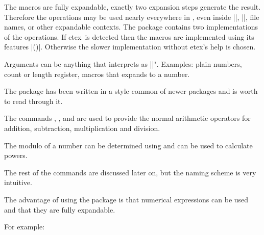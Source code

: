 The macros are fully expandable, exactly two expansion steps generate the
result. Therefore the operations may be used nearly everywhere in \tex, even
inside |\number|, |\csname|, file names, or other expandable contexts.
The package contains two implementations of the operations. If etex\ is detected
then the macros are implemented using its features |(\numexpr)|. Otherwise
the slower implementation without etex's help is chosen.

Arguments can be anything that \tex interprets as |\number|". Examples:
plain numbers, count or length register, macros that expands to a number.

The package has been written in a style common of newer packages and is worth to read through it.




The commands , ,
 and  are used to provide the normal arithmetic operators for addition, subtraction, multiplication and division.

The modulo of a number can be determined using  and 
 can be used to calculate powers.

\begin{teXXX}
\end{teXXX}

\textit{}


The rest of the commands are discussed later on, but the naming scheme is very intuitive.








The advantage of using the package is that numerical expressions can be
used and that they are fully expandable.

For example:

\begin{teXXX}
\end{teXXX}

